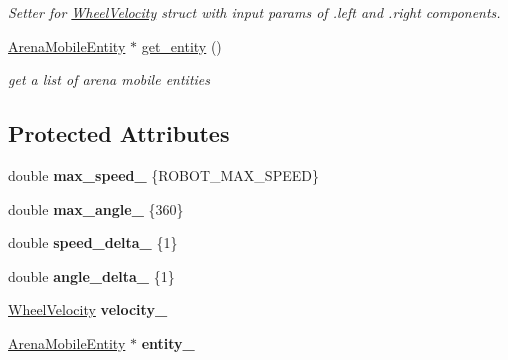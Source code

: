 \begin{DoxyCompactItemize}
\begin{DoxyCompactList}\small\item\em Setter for \hyperlink{structWheelVelocity}{Wheel\+Velocity} struct with input params of .left and .right components. \end{DoxyCompactList}\item 
\hyperlink{classArenaMobileEntity}{Arena\+Mobile\+Entity} $\ast$ \hyperlink{classMotionHandler_ad8472612d15be1ada7f919f45d245adc}{get\+\_\+entity} ()
\begin{DoxyCompactList}\small\item\em get a list of arena mobile entities \end{DoxyCompactList}\end{DoxyCompactItemize}
\subsection*{Protected Attributes}
\begin{DoxyCompactItemize}
\item 
double {\bfseries max\+\_\+speed\+\_\+} \{R\+O\+B\+O\+T\+\_\+\+M\+A\+X\+\_\+\+S\+P\+E\+ED\}\hypertarget{classMotionHandler_a3b63d8870a3e31185585706686883e3b}{}\label{classMotionHandler_a3b63d8870a3e31185585706686883e3b}

\item 
double {\bfseries max\+\_\+angle\+\_\+} \{360\}\hypertarget{classMotionHandler_af6fffdbc6b46d14a54427801e5cd118a}{}\label{classMotionHandler_af6fffdbc6b46d14a54427801e5cd118a}

\item 
double {\bfseries speed\+\_\+delta\+\_\+} \{1\}\hypertarget{classMotionHandler_a657a0fcac894b02b8c64cff811ce519e}{}\label{classMotionHandler_a657a0fcac894b02b8c64cff811ce519e}

\item 
double {\bfseries angle\+\_\+delta\+\_\+} \{1\}\hypertarget{classMotionHandler_ad8ecebbb7c0accd0578a567f9b817cc8}{}\label{classMotionHandler_ad8ecebbb7c0accd0578a567f9b817cc8}

\item 
\hyperlink{structWheelVelocity}{Wheel\+Velocity} {\bfseries velocity\+\_\+}\hypertarget{classMotionHandler_a3f1849d38ef2e007c94d7d79afd4046b}{}\label{classMotionHandler_a3f1849d38ef2e007c94d7d79afd4046b}

\item 
\hyperlink{classArenaMobileEntity}{Arena\+Mobile\+Entity} $\ast$ {\bfseries entity\+\_\+}\hypertarget{classMotionHandler_a659fd1ec8878260a63779bf45681f5a4}{}\label{classMotionHandler_a659fd1ec8878260a63779bf45681f5a4}

\end{DoxyCompactItemize}


